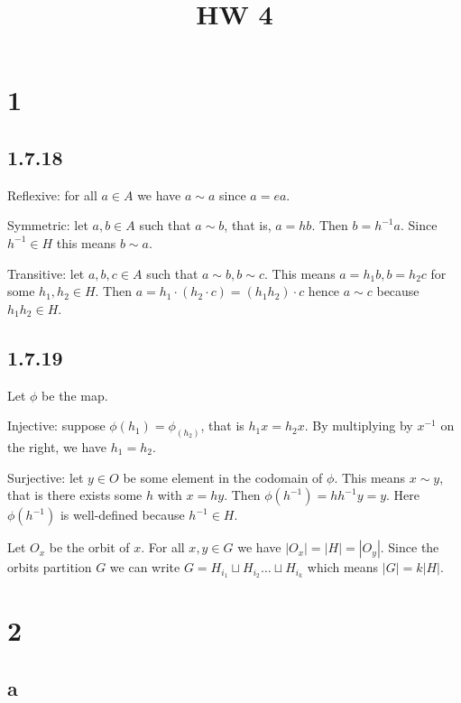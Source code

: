 \documentclass{article}
\title{HW 4}
\date{}
\def\inv{{-1}}
\begin{document}
\maketitle

\section*{1}

\subsection*{1.7.18}

Reflexive: for all $a \in A$ we have $a \sim a$ since $a = e a$.

Symmetric: let $a, b \in A$ such that $a \sim b$, that is, $a = h b$. Then $b = h^\inv a$. Since $h^\inv \in H$ this means $b \sim a$.

Transitive: let $a, b, c \in A$ such that $a \sim b, b \sim c$. This means $a = h_1 b, b = h_2 c$ for some $h_1, h_2 \in H$. Then $a = h_1 \cdot (h_2 \cdot c) = (h_1 h_2) \cdot c$ hence $a \sim c$ because $h_1 h_2 \in H$.

\subsection*{1.7.19}

Let $\phi$ be the map.

Injective: suppose $\phi(h_1) = \phi_(h_2)$, that is $h_1 x = h_2 x$. By multiplying by $x^\inv$ on the right, we have $h_1 = h_2$.

Surjective: let $y \in O$ be some element in the codomain of $\phi$. This means $x \sim y$, that is there exists some $h$ with $x = hy$. Then $\phi(h^\inv) = h h^\inv y = y$. Here $\phi(h^\inv)$ is well-defined because $h^\inv \in H$.

Let $O_x$ be the orbit of $x$. For all $x, y \in G$ we have $|O_x| = |H| = |O_y|$. Since the orbits partition $G$ we can write $G = H_{i_1} \sqcup H_{i_2} \ldots \sqcup H_{i_k}$ which means $|G| = k |H|$.

\section*{2}

\subsection*{a}
\end{document}

